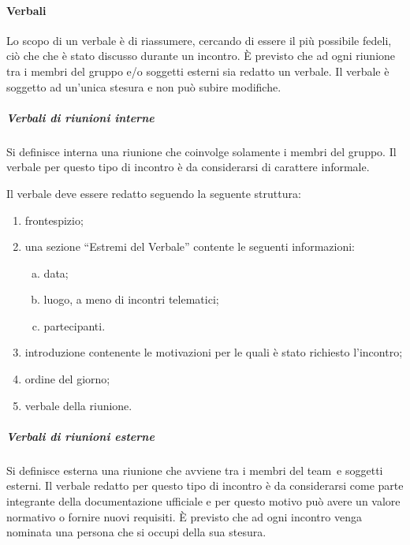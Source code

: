 \documentclass[../NormeProgetto.tex]{subfiles}
\begin{document}
		\paragraph{Verbali}
			Lo scopo di un verbale è di riassumere, cercando di essere il più possibile fedeli, ciò che che è stato discusso durante un incontro. È previsto che ad ogni riunione tra i membri del gruppo e/o soggetti esterni sia redatto un verbale. Il verbale è soggetto ad un'unica stesura e non può subire modifiche.
			
			\subparagraph{Verbali di riunioni interne}
				Si definisce interna una riunione che coinvolge solamente i membri del gruppo. Il verbale per questo tipo di incontro è da considerarsi di carattere informale. 
			
				Il verbale deve essere redatto seguendo la seguente struttura:
				\begin{enumerate}
					\item frontespizio;
					\item una sezione ``Estremi del Verbale'' contente le seguenti informazioni:
					\begin{enumerate}[a.]
						\item data;
						\item luogo, a meno di incontri telematici;
						\item partecipanti.
					\end{enumerate}
					\item introduzione contenente le motivazioni per le quali è stato richiesto l'incontro;
					\item ordine del giorno;
					\item verbale della riunione.
				\end{enumerate}

			\subparagraph{Verbali di riunioni esterne}
				Si definisce esterna una riunione che avviene tra i membri del team\g\ e soggetti esterni. Il verbale redatto per questo tipo di incontro è da considerarsi come parte integrante della documentazione ufficiale e per questo motivo può avere un valore normativo o fornire nuovi requisiti. È previsto che ad ogni incontro venga nominata una persona che si occupi della sua stesura.
			
\end{document}
